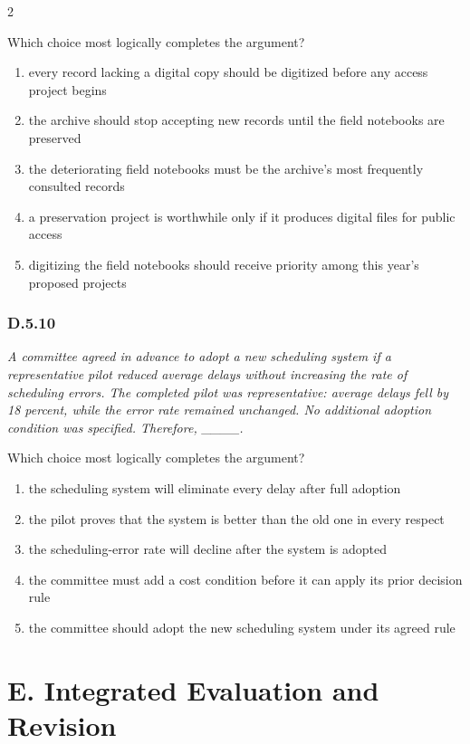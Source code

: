 \documentclass[10pt]{extarticle}
\newcommand{\choice}[1]{\item #1}
\newcommand{\bankitem}[1]{\subsubsection*{#1}}
\begin{document}
\begin{multicols}{2}
\begin{samepage}
Which choice most logically completes the argument?
\begin{enumerate}[label=(\alph*)]
  \choice{every record lacking a digital copy should be digitized before any access project begins}
  \choice{the archive should stop accepting new records until the field notebooks are preserved}
  \choice{the deteriorating field notebooks must be the archive's most frequently consulted records}
  \choice{a preservation project is worthwhile only if it produces digital files for public access}
  \choice{digitizing the field notebooks should receive priority among this year's proposed projects}
\end{enumerate}
\end{samepage}\par\smallskip
\begin{samepage}
\bankitem{D.5.10}
\emph{A committee agreed in advance to adopt a new scheduling system if a representative pilot reduced average delays without increasing the rate of scheduling errors. The completed pilot was representative: average delays fell by 18 percent, while the error rate remained unchanged. No additional adoption condition was specified. Therefore, \_\_\_\_.}

Which choice most logically completes the argument?
\begin{enumerate}[label=(\alph*)]
  \choice{the scheduling system will eliminate every delay after full adoption}
  \choice{the pilot proves that the system is better than the old one in every respect}
  \choice{the scheduling-error rate will decline after the system is adopted}
  \choice{the committee must add a cost condition before it can apply its prior decision rule}
  \choice{the committee should adopt the new scheduling system under its agreed rule}
\end{enumerate}
\end{samepage}\par\smallskip
\section*{E. Integrated Evaluation and Revision}

\end{multicols}
\end{document}
